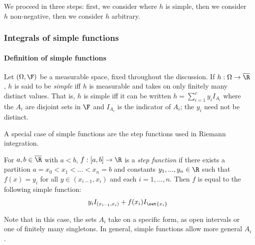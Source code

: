 \documentclass{article} %
\begin{document}
 We proceed in three steps: first, we consider where $h$ is simple, then we consider $h$ non-negative, then we consider $h$ arbitrary. 



\subsubsection{Integrals of simple functions}

\paragraph{Definition of simple functions} 

\begin{definition}
Let $(\Omega, \F)$ be a measurable space, fixed throughout the discussion.  If $h : \Omega \to \overline{\R}$, $h$ is said to be \textit{simple} iff $h$ is measurable and takes on only finitely many distinct values.  That is, $h$ is simple iff it can be written $h = \sum_{i=1}^r y_i I_{A_i}$ where the $A_i$ are disjoint sets in $\F$ and $I_{A_i}$ is the indicator of $A_i$; the $y_i$ need not be distinct. 
\label{def:simple_function}	
\end{definition}

\begin{remark}{}
A special case of simple functions are the step functions used in Riemann integration. 


For $a,b \in \overline{\R}$ with $a<b$, $f : [a,b] \to \R$ is a \textit{step function} if there exists a partition $a = x_0 < x_1 < ... < x_n = b$ and constants $y_1, ..., y_n \in \R$ such that $f(x)=y_i$ for all $y \in (x_{i-1},x_i)$ and each $i=1,...,n$.  Then $f$ is equal to the following simple function:
\[ y_i I_{(x_{i-1}, x_i)} + f(x_i) I_{\set{x_i}}\]

Note that in this case, the sets $A_i$ take on a specific form, as open intervals or one of finitely many singletons.  In general, simple functions allow more general $A_i$. 

\label{rk:simple_functions_generalize_step_functions}
\end{remark}
\end{document}
